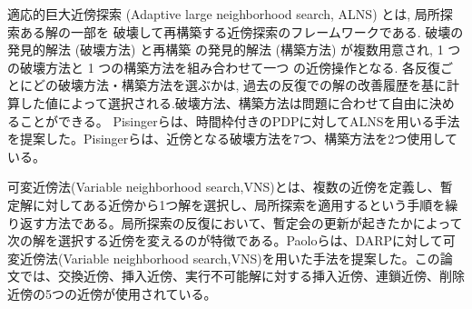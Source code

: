 適応的巨大近傍探索 (Adaptive large neighborhood search, ALNS) とは, 局所探索ある解の一部を 破壊して再構築する近傍探索のフレームワークである\cite{ALNS}. 破壊の発見的解法 (破壊方法) と再構築 の発見的解法 (構築方法) が複数用意され, 1 つの破壊方法と 1 つの構築方法を組み合わせて一つ の近傍操作となる. 各反復ごとにどの破壊方法・構築方法を選ぶかは, 過去の反復での解の改善履歴を基に計算した値によって選択される.破壊方法、構築方法は問題に合わせて自由に決めることができる。
Pisingerらは、時間枠付きのPDPに対してALNSを用いる手法を提案した\cite{pisinger}。Pisingerらは、近傍となる破壊方法を7つ、構築方法を2つ使用している。

可変近傍法(Variable neighborhood search,VNS)とは、複数の近傍を定義し、暫定解に対してある近傍から1つ解を選択し、局所探索を適用するという手順を繰り返す方法である。局所探索の反復において、暫定会の更新が起きたかによって次の解を選択する近傍を変えるのが特徴である。Paoloらは、DARPに対して可変近傍法(Variable neighborhood search,VNS)を用いた手法を提案した。この論文では、交換近傍、挿入近傍、実行不可能解に対する挿入近傍、連鎖近傍、削除近傍の5つの近傍が使用されている。
